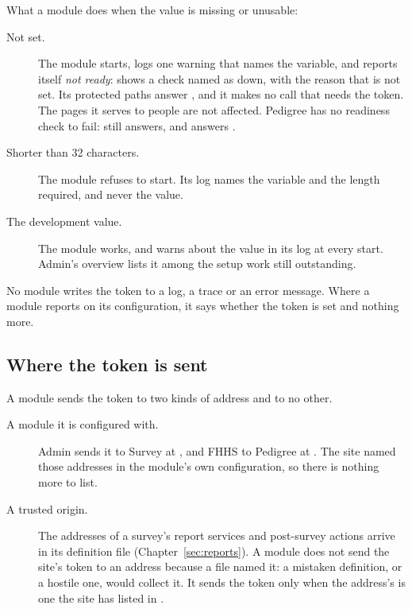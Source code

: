 \documentclass[11pt, a4paper]{article}
\begin{document}
\noindent What a module does when the value is missing or unusable:

\begin{description}
  \item[Not set.] The module starts, logs one warning that names the variable, and reports
        itself \emph{not ready}:  shows a check named 
        as down, with the reason that  is not set. Its protected
        paths answer , and it makes no call that needs the token. The pages it serves
        to people are not affected. Pedigree has no readiness check to fail: 
        still answers, and  answers .
  \item[Shorter than 32 characters.] The module refuses to start. Its log names the variable
        and the length required, and never the value.
  \item[The development value.] The module works, and warns about the value in its log at
        every start. Admin's  overview lists it among the setup work still
        outstanding.
\end{description}

No module writes the token to a log, a trace or an error message. Where a module reports on
its configuration, it says whether the token is set and nothing more.

\subsection{Where the token is sent}
\label{sec:service-token-origins}

A module sends the token to two kinds of address and to no other.

\begin{description}
  \item[A module it is configured with.] Admin sends it to Survey at ,
        and FHHS to Pedigree at . The site named those addresses in the
        module's own configuration, so there is nothing more to list.
  \item[A trusted origin.] The addresses of a survey's report services and post-survey
        actions arrive in its definition file (Chapter~\ref{sec:reports}). A module does not
        send the site's token to an address because a file named it: a mistaken definition, or
        a hostile one, would collect it. It sends the token only when the address's
         is one the site has listed in .
\end{description}
\end{document}
